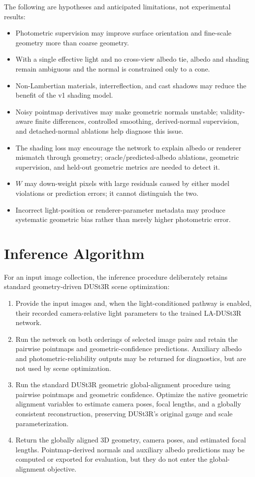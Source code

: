 \documentclass[11pt,a4paper]{article}
\begin{document}
The following are hypotheses and anticipated limitations, not experimental
results:
\begin{itemize}
  \item Photometric supervision may improve surface orientation and fine-scale
  geometry more than coarse geometry.
  \item With a single effective light and no cross-view albedo tie, albedo
  and shading remain ambiguous and the normal is constrained only to a cone.
  \item Non-Lambertian materials, interreflection, and cast shadows may
  reduce the benefit of the v1 shading model.
  \item Noisy pointmap derivatives may make geometric normals unstable;
  validity-aware finite differences, controlled smoothing, derived-normal
  supervision, and detached-normal ablations help diagnose this issue.
  \item The shading loss may encourage the network to explain albedo or
  renderer mismatch through geometry; oracle/predicted-albedo ablations,
  geometric supervision, and held-out geometric metrics are needed to detect it.
  \item $W$ may down-weight pixels with large residuals caused by either
  model violations or prediction errors; it cannot distinguish the two.
  \item Incorrect light-position or renderer-parameter metadata may produce
  systematic geometric bias rather than merely higher photometric error.
\end{itemize}

\section{Inference Algorithm}

For an input image collection, the inference procedure deliberately retains
standard geometry-driven DUSt3R scene optimization:
\begin{enumerate}
  \item Provide the input images and, when the light-conditioned pathway is
  enabled, their recorded camera-relative light parameters to the trained
  LA-DUSt3R network.
  \item Run the network on both orderings of selected image pairs and retain
  the pairwise pointmaps and geometric-confidence predictions. Auxiliary
  albedo and photometric-reliability outputs may be returned for diagnostics,
  but are not used by scene optimization.
  \item Run the standard DUSt3R geometric global-alignment procedure using
  pairwise pointmaps and geometric confidence. Optimize the native geometric
  alignment variables to estimate camera poses, focal lengths, and a globally
  consistent reconstruction, preserving DUSt3R's original gauge and scale
  parameterization.
  \item Return the globally aligned 3D geometry, camera poses, and estimated
  focal lengths. Pointmap-derived normals and auxiliary albedo predictions
  may be computed or exported for evaluation, but they do not enter the
  global-alignment objective.
\end{enumerate}
\end{document}
